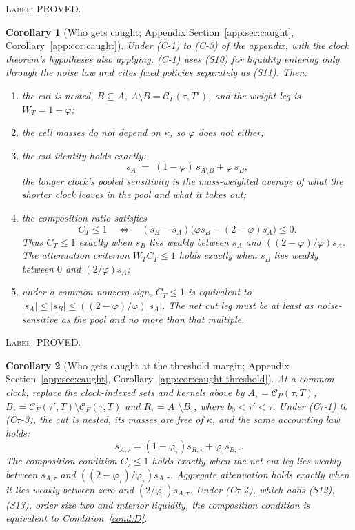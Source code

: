 \documentclass[11pt]{article}
\newtheorem{corollary}{Corollary}
\begin{document}
\noindent\textsc{Label: PROVED.}\par
\begin{corollary}[Who gets caught; Appendix Section~\ref{app:sec:caught}, Corollary~\ref{app:cor:caught}]
\label{cor:caught}
Under (C-1) to (C-3) of the appendix, with the clock theorem's hypotheses also applying, (C-1)
uses (S10) for liquidity entering only through the noise law and cites fixed policies separately as
(S11). Then:
\begin{enumerate}[label=(\roman*),leftmargin=2.4em,itemsep=2pt]
\item the cut is nested, $B \subseteq A$, $A\setminus B = \mathcal C_P(\tau,T')$, and the
  weight leg is $W_T = 1-\varphi$;
\item the cell masses do not depend on $\kappa$, so $\varphi$ does not either;
\item the cut identity holds exactly:
  \[
  s_A \;=\; (1-\varphi)\,s_{A\setminus B} + \varphi\,s_B,
  \]
  the longer clock's pooled sensitivity is the mass-weighted average of what the shorter clock
  leaves in the pool and what it takes out;
\item the composition ratio satisfies
  \[
  C_T\leq1
  \quad\Longleftrightarrow\quad
  (s_B-s_A)\bigl(\varphi s_B-(2-\varphi)s_A\bigr)\leq0.
  \]
  Thus $C_T\leq1$ exactly when $s_B$ lies weakly between $s_A$ and
  $((2-\varphi)/\varphi)s_A$. The attenuation criterion $W_TC_T\leq1$ holds exactly when
  $s_B$ lies weakly between $0$ and $(2/\varphi)s_A$;
\item under a common nonzero sign, $C_T\leq1$ is equivalent to
  $|s_A|\leq|s_B|\leq((2-\varphi)/\varphi)|s_A|$. The net cut leg must be at least as
  noise-sensitive as the pool and no more than that multiple.
\end{enumerate}
\end{corollary}

\noindent\textsc{Label: PROVED.}\par
\begin{corollary}[Who gets caught at the threshold margin; Appendix Section~\ref{app:sec:caught}, Corollary~\ref{app:cor:caught-threshold}]
\label{cor:caught-threshold}
At a common clock, replace the clock-indexed sets and kernels above by
$A_\tau=\mathcal C_P(\tau,T)$,
$B_\tau=\mathcal C_F(\tau',T)\setminus\mathcal C_F(\tau,T)$ and
$R_\tau=A_\tau\setminus B_\tau$, where $b_0<\tau'<\tau$. Under (C$\tau$-1) to (C$\tau$-3), the
cut is nested, its masses are free of $\kappa$, and the same accounting law holds:
\[
s_{A,\tau}=(1-\varphi_\tau)s_{R,\tau}+\varphi_\tau s_{B,\tau}.
\]
The composition condition $C_\tau\leq1$ holds exactly when the net cut leg lies weakly between
$s_{A,\tau}$ and $((2-\varphi_\tau)/\varphi_\tau)s_{A,\tau}$. Aggregate attenuation holds exactly
when it lies weakly between zero and $(2/\varphi_\tau)s_{A,\tau}$. Under (C$\tau$-4), which adds
(S12), (S13), order size two and interior liquidity, the composition condition is equivalent to
Condition~\ref{cond:D}.
\end{corollary}
\end{document}
